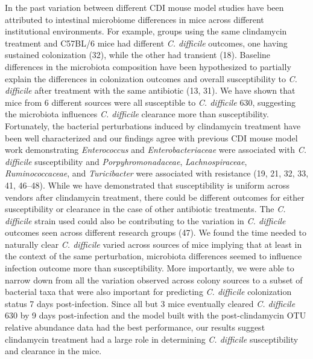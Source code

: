 \documentclass[11pt,]{article}
\begin{document}
In the past variation between different CDI mouse model studies have
been attributed to intestinal microbiome differences in mice across
different institutional environments. For example, groups using the same
clindamycin treatment and C57BL/6 mice had different \emph{C. difficile}
outcomes, one having sustained colonization (32), while the other had
transient (18). Baseline differences in the microbiota composition have
been hypothesized to partially explain the differences in colonization
outcomes and overall susceptibility to \emph{C. difficile} after
treatment with the same antibiotic (13, 31). We have shown that mice
from 6 different sources were all susceptible to \emph{C. difficile}
630, suggesting the microbiota influences \emph{C. difficile} clearance
more than susceptibility. Fortunately, the bacterial perturbations
induced by clindamycin treatment have been well characterized and our
findings agree with previous CDI mouse model work demonstrating
\emph{Enterococcus} and \emph{Enterobacteriaceae} were associated with
\emph{C. difficile} susceptibility and \emph{Porpyhromonadaceae},
\emph{Lachnospiraceae}, \emph{Ruminococcaceae}, and \emph{Turicibacter}
were associated with resistance (19, 21, 32, 33, 41, 46--48). While we
have demonstrated that susceptibility is uniform across vendors after
clindamycin treatment, there could be different outcomes for either
susceptibility or clearance in the case of other antibiotic treatments.
The \emph{C. difficile} strain used could also be contributing to the
variation in \emph{C. difficile} outcomes seen across different research
groups (47). We found the time needed to naturally clear \emph{C.
difficile} varied across sources of mice implying that at least in the
context of the same perturbation, microbiota differences seemed to
influence infection outcome more than susceptibility. More importantly,
we were able to narrow down from all the variation observed across
colony sources to a subset of bacterial taxa that were also important
for predicting \emph{C. difficile} colonization status 7 days
post-infection. Since all but 3 mice eventually cleared \emph{C.
difficile} 630 by 9 days post-infection and the model built with the
post-clindamycin OTU relative abundance data had the best performance,
our results suggest clindamycin treatment had a large role in
determining \emph{C. difficile} susceptibility and clearance in the
mice.
\end{document}
